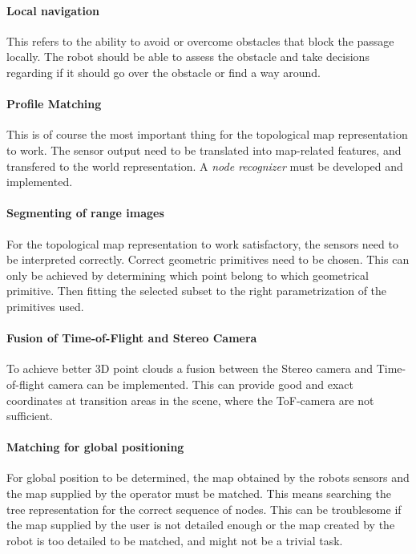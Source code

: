 \paragraph{Local navigation} This refers to the ability to avoid or overcome obstacles
that block the passage locally. The robot should be able to assess the obstacle and take
decisions regarding if it should go over the obstacle or find a way around. 

\paragraph{Profile Matching} This is of course the most important thing for the
topological map representation to work. The sensor output need to be translated into 
map-related features, and transfered to the world representation. A \emph{node recognizer}
must be developed and implemented.

\paragraph{Segmenting of range images} For the topological map representation to work
satisfactory, the sensors need to be interpreted correctly. Correct geometric primitives 
need to be chosen.  This can only
be achieved by determining which point belong to which geometrical primitive. Then fitting
the selected subset to the right parametrization of the primitives used. 

\paragraph{Fusion of Time-of-Flight and Stereo Camera} To achieve better 3D point clouds
a fusion between the Stereo camera and Time-of-flight camera can be implemented. This can
provide good and exact coordinates at transition areas in the scene, where the ToF-camera
are not sufficient. 


\paragraph{Matching for global positioning} For global position to be determined, the map
obtained by the robots sensors and the map supplied by the operator must be matched. This
means searching the tree representation for the correct sequence of nodes. This
can be troublesome if the map supplied by the user is not detailed enough or the map
created by the robot is too detailed to be matched, and might not be a trivial task. 

